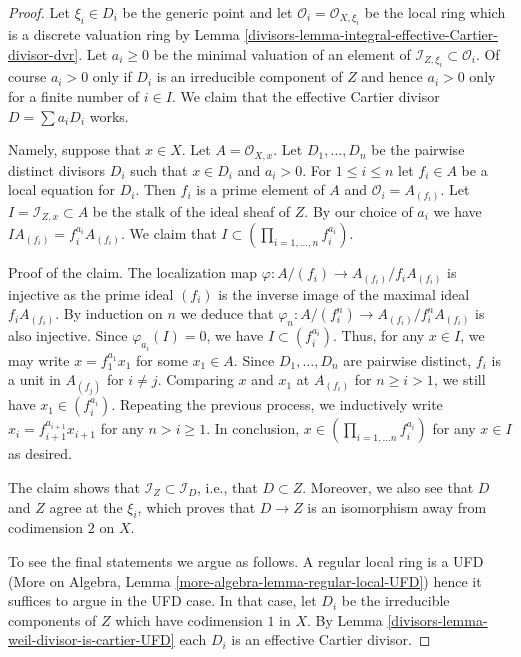 \begin{proof}

Let $\xi_i \in D_i$ be the generic point and let
$\mathcal{O}_i = \mathcal{O}_{X, \xi_i}$ be the local ring
which is a discrete valuation ring by
Lemma \ref{divisors-lemma-integral-effective-Cartier-divisor-dvr}.
Let $a_i \geq 0$ be the minimal valuation of an element of
$\mathcal{I}_{Z, \xi_i} \subset \mathcal{O}_i$.
Of course $a_i > 0$ only if $D_i$ is an irreducible component
of $Z$ and hence $a_i > 0$ only for a finite number of $i \in I$.
We claim that the effective Cartier divisor $D = \sum a_i D_i$ works.

\medskip\noindent
Namely, suppose that $x \in X$. Let $A = \mathcal{O}_{X, x}$.
Let $D_1, \ldots, D_n$ be the pairwise distinct divisors
$D_i$ such that $x \in D_i$ and $a_i > 0$.
For $1 \leq i \leq n$ let $f_i \in A$ be a local equation for $D_i$.
Then $f_i$ is a prime element of $A$ and $\mathcal{O}_i = A_{(f_i)}$. Let
$I = \mathcal{I}_{Z, x} \subset A$ be the stalk of the
ideal sheaf of $Z$. By our choice of $a_i$ we have
$I A_{(f_i)} = f_i^{a_i}A_{(f_i)}$. We claim that
$I \subset (\prod_{i = 1, \ldots, n} f_i^{a_i})$.

\medskip\noindent
Proof of the claim. The localization map
$\varphi : A/(f_i) \to A_{(f_i)}/f_iA_{(f_i)}$ is injective as
the prime ideal $(f_i)$ is the inverse image of the maximal ideal
$f_iA_{(f_i)}$. By induction on $n$ we deduce that
$\varphi_n : A/(f_i^n)\to A_{(f_i)}/f_i^nA_{(f_i)}$ is also injective.
Since $\varphi_{a_i}(I) = 0$, we have $I \subset (f_i^{a_i})$.
Thus, for any $x \in I$, we may write $x = f_1^{a_1}x_1$
for some $x_1 \in A$. Since $D_1, \ldots, D_n$ are pairwise
distinct, $f_i$ is a unit in $A_{(f_j)}$ for $i \not = j$.
Comparing $x$ and $x_1$ at $A_{(f_i)}$
for $n \geq i > 1$, we still have $x_1 \in (f_i^{a_i})$.
Repeating the previous process, we inductively write
$x_i = f_{i + 1}^{a_{i + 1}}x_{i + 1}$ for any $n > i \geq 1$.
In conclusion, $x \in (\prod_{i = 1, \ldots n} f_i^{a_i})$
for any $x \in I$ as desired.

\medskip\noindent
The claim shows that $\mathcal{I}_Z \subset \mathcal{I}_D$, i.e., that
$D \subset Z$. Moreover, we also see that $D$ and $Z$ agree at the $\xi_i$,
which proves that $D \to Z$ is an isomorphism away from codimension $2$ on $X$.

\medskip\noindent
To see the final statements we argue as follows. A regular local
ring is a UFD (More on Algebra, Lemma
\ref{more-algebra-lemma-regular-local-UFD}) hence it suffices
to argue in the UFD case. In that case, let
$D_i$ be the irreducible components of $Z$
which have codimension $1$ in $X$.
By Lemma \ref{divisors-lemma-weil-divisor-is-cartier-UFD} each $D_i$
is an effective Cartier divisor.
\end{proof}

